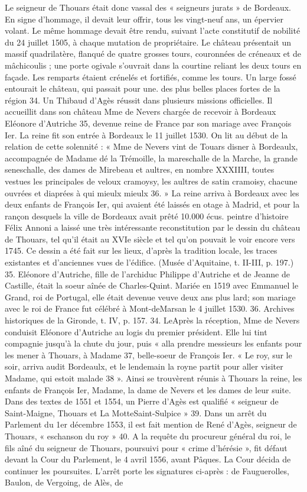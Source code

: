 Le seigneur de Thouars était donc vassal des « seigneurs jurats » de Bordeaux. En signe d'hommage, il devait leur offrir, tous les vingt-neuf ans, un épervier volant. Le même hommage devait être rendu, suivant l'acte constitutif de nobilité du 24 juillet 1505, à chaque mutation de propriétaire. Le château présentait un massif quadrilatère, flanqué de quatre grosses tours, couronnées de créneaux et de mâchicoulis ; une porte ogivale s'ouvrait dans la courtine reliant les deux tours en façade. Les remparts étaient crénelés et fortifiés, comme les tours. Un large fossé entourait le château, qui passait pour une. des plus belles places fortes de la région 34. Un Thibaud d'Agès réussit dans plusieurs missions officielles. Il accueillit dans son château Mme de Nevers chargée de recevoir à Bordeaux Eléonore d'Autriche 35, devenue reine de France par son mariage avec François Ier. La reine fit son entrée à Bordeaux le 11 juillet 1530. On lit au début de la relation de cette solennité : « Mme de Nevers vint de Touars disner à Bordeaulx, accompagnée de Madame dé la Trémoille, la mareschalle de la Marche, la grande seneschalle, des dames de Mirebeau et aultres, en nombre XXXIIII, toutes vestues les principales de veloux cramoysy, les aultres de satin cramoisy, chacune ouvrées et diaprées à qui mieulx mieulx 36. » La reine arriva à Bordeaux avec les deux enfants de François Ier, qui avaient été laissés en otage à Madrid, et pour la rançon desquels la ville de Bordeaux avait prêté 10.000 écus. peintre d'histoire Félix Annoni a laissé une très intéressante reconstitution par le dessin du château de Thouars, tel qu'il était au XVIe siècle et tel qu'on pouvait le voir encore vers 1745. Ce dessin a été fait sur les lieux, d'après la tradition locale, les traces existantes et d'anciennes vues de l'édifice. (Musée d'Aquitaine, t. II-III, p. 197.) 35. Eléonore d'Autriche, fille de l'archiduc Philippe d'Autriche et de Jeanne de Castille, était la soeur aînée de Charles-Quint. Mariée en 1519 avec Emmanuel le Grand, roi de Portugal, elle était devenue veuve deux ans plus lard; son mariage avec le roi de France fut célébré à Mont-deMarsan le 4 juillet 1530. 36. Archives historiques de la Gironde, t. IV, p. 157. 34. LeAprès la réception, Mme de Nevers conduisit Eléonore d'Autriche au logis du premier président. Elle lui tint compagnie jusqu'à la chute du jour, puis « alla prendre messieurs les enfants pour les mener à Thouars, à Madame 37, belle-soeur de François Ier. « Le roy, sur le soir, arriva audit Bordeaulx, et le lendemain la royne partit pour aller visiter Madame, qui estoit malade 38 ». Ainsi se trouvèrent réunis à Thouars la reine, les enfants de François Ier, Madame, la dame de Nevers et les dames de leur suite. Dans des textes de 1551 et 1554, un Pierre d'Agès est qualifié « seigneur de Saint-Maigne, Thouars et La MotteSaint-Sulpice » 39. Dans un arrêt du Parlement du 1er décembre 1553, il est fait mention de René d'Agès, seigneur de Thouars, « eschanson du roy » 40. A la requête du procureur général du roi, le fils aîné du seigneur de Thouars, poursuivi pour « crime d'hérésie », fit défaut devant la Cour du Parlement, le 4 avril 1556, avant Pâques. La Cour décida de continuer les poursuites. L'arrêt porte les signatures ci-après : de Fauguerolles, Baulon, de Vergoing, de Alès, de 